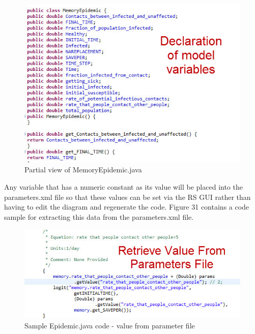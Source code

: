 \documentclass[11pt]{amsart}
\begin{document}
\begin{figure}[ht]
\begin{center}
\vspace{.2in}
\centerline {
\includegraphics[totalheight=0.3\textheight]{images/028.jpg}
}
\caption{Partial view of MemoryEpidemic.java}
\label{fig:028}
\end{center}
\end{figure}


Any variable that has a numeric constant as its value will be placed into the parameters.xml file so that these values can be set via the RS GUI rather than having to edit the diagram and regenerate the code. Figure 31 contains a code sample for extracting this data from the parameters.xml file.

\begin{figure}[ht]
\begin{center}
\vspace{.2in}
\centerline {
\includegraphics[totalheight=0.3\textheight]{images/029.jpg}
}
\caption{Sample Epidemic.java code - value from parameter file}
\label{fig:029}
\end{center}
\end{figure}
\end{document}
